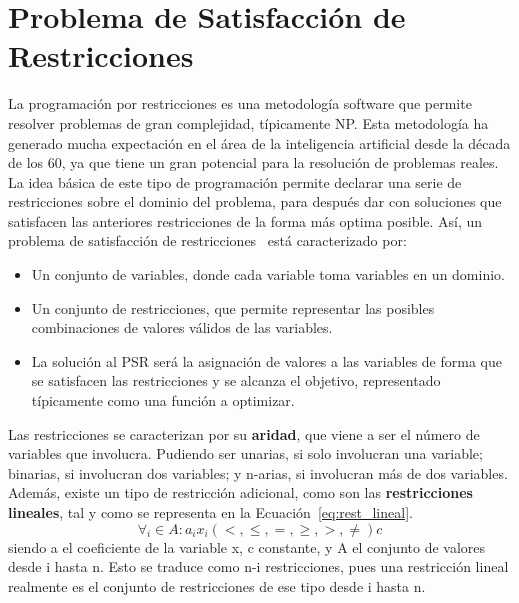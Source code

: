 \section{Problema de Satisfacción de Restricciones}
La programación por restricciones es una metodología software que permite resolver problemas de gran complejidad, típicamente NP. Esta metodología ha generado mucha expectación en el área de la inteligencia artificial desde la década de los 60, ya que tiene un gran potencial para la resolución de problemas reales. La idea básica de este tipo de programación permite declarar una serie de restricciones sobre el dominio del problema, para después dar con soluciones que satisfacen las anteriores restricciones de la forma más optima posible. Así, un problema de satisfacción de restricciones~\cite{Russ06} está caracterizado por:
\begin{itemize}
	\item Un conjunto de variables, donde cada variable toma variables en un dominio.
	\item Un conjunto de restricciones, que permite representar las posibles combinaciones de valores válidos de las variables.
	\item La solución al \gls{PSR} será la asignación de valores a las variables de forma que se satisfacen las restricciones y se alcanza el objetivo, representado típicamente como una función a optimizar.
\end{itemize}
Las restricciones se caracterizan por su \textbf{aridad}, que viene a ser el número de variables que involucra. Pudiendo ser unarias, si solo involucran una variable; binarias, si involucran dos variables; y n-arias, si involucran más de dos variables. Además, existe un tipo de restricción adicional, como son las \textbf{restricciones lineales}, tal y como se representa en la Ecuación~\ref{eq:rest_lineal}.
\begin{equation}
  \label{eq:rest_lineal}
  \forall_{i} \in A :  a_{i}x_{i} (<,\leq,=,\geq,>,\neq) c
\end{equation}
siendo a el coeficiente de la variable x, c constante, y A el conjunto de valores desde i hasta n. Esto se traduce como n-i restricciones, pues una restricción lineal realmente es el conjunto de restricciones de ese tipo desde i hasta n.\\
